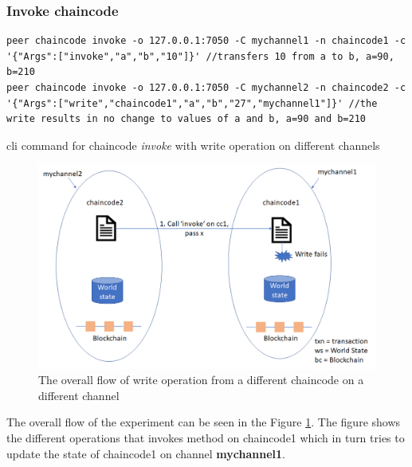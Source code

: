 \documentclass[
  a4paper,  %
  twoside,  %
  bibliography=totoc,
  headsepline,
  cleardoublepage=empty,
  parskip=half,
  draft=false
]{scrbook}
\begin{document}
\subsubsection{Invoke chaincode}
\begin{Listing}[h!]
\begin{lstlisting}
peer chaincode invoke -o 127.0.0.1:7050 -C mychannel1 -n chaincode1 -c '{"Args":["invoke","a","b","10"]}' //transfers 10 from a to b, a=90, b=210
peer chaincode invoke -o 127.0.0.1:7050 -C mychannel2 -n chaincode2 -c '{"Args":["write","chaincode1","a","b","27","mychannel1"]}' //the write results in no change to values of a and b, a=90 and b=210
\end{lstlisting}
\caption{cli command for chaincode \textit{invoke} with write operation on different channels}
\label{lst:winv2}
\end{Listing}
\begin{figure}[h!]
\begin{center}
\includegraphics[width=\textwidth]{graphics/writesc2.png}
\caption{The overall flow of write operation from a different chaincode on a different channel}
\label{fig:writesc2}
\end{center}
\end{figure}
The overall flow of the experiment can be seen in the Figure \ref{fig:writesc2}. The figure shows the different operations that invokes method on chaincode1 which in turn tries to update the state of chaincode1 on channel \textbf{mychannel1}.
\end{document}

